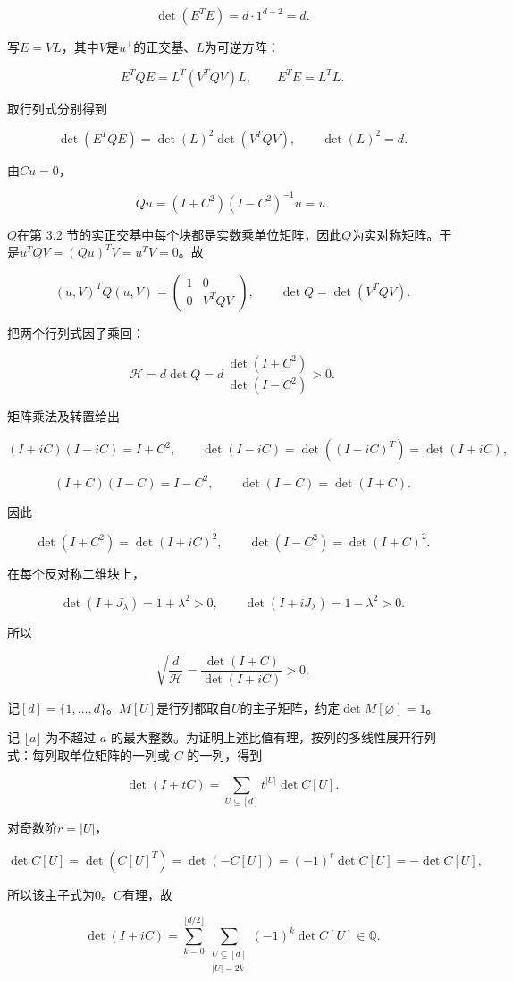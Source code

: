 \documentclass[11pt,a4paper]{article}
\begin{document}
\[\det(E^TE)=d\cdot1^{d-2}=d.\]

写\(E=VL\)，其中\(V\)是\(u^\perp\)的正交基、\(L\)为可逆方阵：

\[E^TQE=L^T(V^TQV)L,\qquad
E^TE=L^TL.\]

取行列式分别得到

\[\det(E^TQE)=\det(L)^2\det(V^TQV),\qquad
\det(L)^2=d.\]

由\(Cu=0\)，

\[Qu=(I+C^2)(I-C^2)^{-1}u=u.\]

\(Q\)在第 3.2 节的实正交基中每个块都是实数乘单位矩阵，因此\(Q\)为实对称矩阵。于是\(u^TQV=(Qu)^TV=u^TV=0\)。故

\[(u,V)^TQ(u,V)=
\begin{pmatrix}1&0\\0&V^TQV\end{pmatrix},
\qquad \det Q=\det(V^TQV).\]

把两个行列式因子乘回：

\[\mathcal H=d\det Q
=d\,\frac{\det(I+C^2)}{\det(I-C^2)}>0.\]

矩阵乘法及转置给出

\[(I+iC)(I-iC)=I+C^2,\qquad
\det(I-iC)=\det((I-iC)^T)=\det(I+iC),\]

\[(I+C)(I-C)=I-C^2,\qquad \det(I-C)=\det(I+C).\]

因此

\[\det(I+C^2)=\det(I+iC)^2,\qquad
\det(I-C^2)=\det(I+C)^2.\]

在每个反对称二维块上，

\[\det(I+J_\lambda)=1+\lambda^2>0,\qquad
\det(I+iJ_\lambda)=1-\lambda^2>0.\]

所以

\[\sqrt{\frac d{\mathcal H}}
=\frac{\det(I+C)}{\det(I+iC)}>0.\]

记\([d]=\{1,\ldots,d\}\)。\(M[U]\)是行列都取自\(U\)的主子矩阵，约定\(\det M[\varnothing]=1\)。

记 \(\lfloor a\rfloor\) 为不超过 \(a\) 的最大整数。为证明上述比值有理，按列的多线性展开行列式：每列取单位矩阵的一列或 \(C\) 的一列，得到

\[\det(I+tC)=\sum_{U\subseteq[d]}t^{|U|}\det C[U].\]

对奇数阶\(r=|U|\)，

\[\det C[U]=\det(C[U]^T)=\det(-C[U])
=(-1)^r\det C[U]=-\det C[U],\]

所以该主子式为0。\(C\)有理，故

\[\det(I+iC)
=\sum_{k=0}^{\lfloor d/2\rfloor}\sum_{\substack{U\subseteq[d]\\|U|=2k}}
(-1)^k\det C[U]\in\mathbb Q.\]
\end{document}
